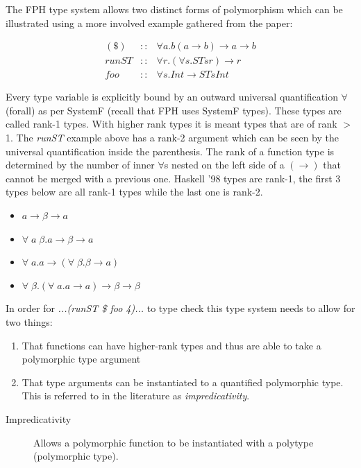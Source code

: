 \documentclass[twoside, titlepage, openright, a4paper]{book}
\newcommand{\Varid}[1]{\mathit{#1}}
\begin{document}
The FPH type system allows two distinct forms of polymorphism which can be illustrated using a more involved example gathered from the paper\cite{FPH}:

\begin{eqnarray*}
(\$)  &::& \forall a. b (a\rightarrow b) \rightarrow a \rightarrow b\\
runST &::& \forall r. (\forall s. ST s r) \rightarrow r\\
foo   &::& \forall s. Int \rightarrow ST s Int
\end{eqnarray*}

Every type variable is explicitly bound by an outward universal quantification $\forall$ (forall) as per SystemF (recall that FPH uses SystemF types). These types are called rank-1 types. With higher rank types it is meant types that are of rank $>$ 1.
The \textit{runST} example above has a rank-2 argument which can be seen by the universal quantification inside the parenthesis.
The rank of a function type is determined by the number of inner \ensuremath{\forall}s nested on the left side of a \ensuremath{(\to )} that cannot be merged with a previous one.
Haskell '98 types are rank-1, the first 3 types below are all rank-1 types while the last one is rank-2.
\begin{itemize}
\item \ensuremath{\Varid{a}\to \beta\to \Varid{a}}
\item \ensuremath{\forall\;\Varid{a}\;\beta\mbox{.}\Varid{a}\to \beta\to \Varid{a}}
\item \ensuremath{\forall\;\Varid{a}\mbox{.}\Varid{a}\to (\forall\;\beta\mbox{.}\beta\to \Varid{a})}
\item \ensuremath{\forall\;\beta\mbox{.}(\forall\;\Varid{a}\mbox{.}\Varid{a}\to \Varid{a})\to \beta\to \beta}
\end{itemize}

In order for \textit{...(runST \$ foo 4)...} to type check this type system needs to allow for two things:
\begin{enumerate}
\item That functions can have higher-rank types and thus are able to take a polymorphic type argument
\item That type arguments can be instantiated to a quantified polymorphic type. This is referred to in the literature as \textit{impredicativity}.
\end{enumerate}

\begin{description}
\item[Impredicativity] Allows a polymorphic function to be instantiated with a polytype (polymorphic type). 
\end{description}
\end{document}
